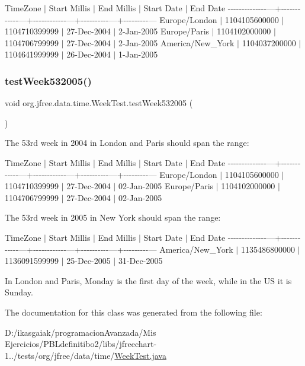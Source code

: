 Time\+Zone $\vert$ Start Millis $\vert$ End Millis $\vert$ Start Date $\vert$ End Date -\/-\/-\/-\/-\/-\/-\/-\/-\/-\/-\/-\/-\/-\/---+-\/-\/-\/-\/-\/-\/-\/-\/-\/-\/-\/-\/---+-\/-\/-\/-\/-\/-\/-\/-\/-\/-\/-\/-\/---+-\/-\/-\/-\/-\/-\/-\/-\/-\/-\/---+-\/-\/-\/-\/-\/-\/-\/-\/-\/--- Europe/\+London $\vert$ 1104105600000 $\vert$ 1104710399999 $\vert$ 27-\/\+Dec-\/2004 $\vert$ 2-\/\+Jan-\/2005 Europe/\+Paris $\vert$ 1104102000000 $\vert$ 1104706799999 $\vert$ 27-\/\+Dec-\/2004 $\vert$ 2-\/\+Jan-\/2005 America/\+New\+\_\+\+York $\vert$ 1104037200000 $\vert$ 1104641999999 $\vert$ 26-\/\+Dec-\/2004 $\vert$ 1-\/\+Jan-\/2005 \mbox{\label{classorg_1_1jfree_1_1data_1_1time_1_1_week_test_a25f195d16a3677d27101524762df04a5}} 
\subsubsection{\texorpdfstring{test\+Week532005()}{testWeek532005()}}
{\footnotesize\ttfamily void org.\+jfree.\+data.\+time.\+Week\+Test.\+test\+Week532005 (\begin{DoxyParamCaption}{ }\end{DoxyParamCaption})}

The 53rd week in 2004 in London and Paris should span the range\+:

Time\+Zone $\vert$ Start Millis $\vert$ End Millis $\vert$ Start Date $\vert$ End Date -\/-\/-\/-\/-\/-\/-\/-\/-\/-\/-\/-\/-\/-\/---+-\/-\/-\/-\/-\/-\/-\/-\/-\/-\/-\/-\/---+-\/-\/-\/-\/-\/-\/-\/-\/-\/-\/-\/-\/---+-\/-\/-\/-\/-\/-\/-\/-\/-\/-\/---+-\/-\/-\/-\/-\/-\/-\/-\/-\/--- Europe/\+London $\vert$ 1104105600000 $\vert$ 1104710399999 $\vert$ 27-\/\+Dec-\/2004 $\vert$ 02-\/\+Jan-\/2005 Europe/\+Paris $\vert$ 1104102000000 $\vert$ 1104706799999 $\vert$ 27-\/\+Dec-\/2004 $\vert$ 02-\/\+Jan-\/2005

The 53rd week in 2005 in New York should span the range\+:

Time\+Zone $\vert$ Start Millis $\vert$ End Millis $\vert$ Start Date $\vert$ End Date -\/-\/-\/-\/-\/-\/-\/-\/-\/-\/-\/-\/-\/-\/---+-\/-\/-\/-\/-\/-\/-\/-\/-\/-\/-\/-\/---+-\/-\/-\/-\/-\/-\/-\/-\/-\/-\/-\/-\/---+-\/-\/-\/-\/-\/-\/-\/-\/-\/-\/---+-\/-\/-\/-\/-\/-\/-\/-\/-\/--- America/\+New\+\_\+\+York $\vert$ 1135486800000 $\vert$ 1136091599999 $\vert$ 25-\/\+Dec-\/2005 $\vert$ 31-\/\+Dec-\/2005

In London and Paris, Monday is the first day of the week, while in the US it is Sunday. 

The documentation for this class was generated from the following file\+:\begin{DoxyCompactItemize}
\item 
D\+:/ikasgaiak/programacion\+Avanzada/\+Mis Ejercicios/\+P\+B\+Ldefinitibo2/libs/jfreechart-\/1../tests/org/jfree/data/time/\mbox{\hyperlink{_week_test_8java}{Week\+Test.\+java}}\end{DoxyCompactItemize}
